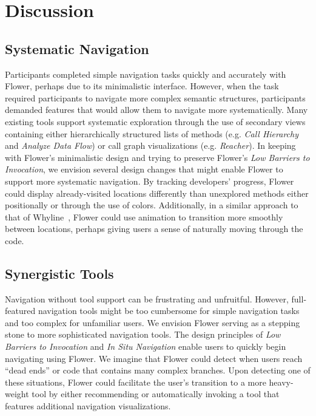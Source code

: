 \documentclass[conference]{IEEEtran}
\begin{document}
\section{Discussion}

\subsection{Systematic Navigation}
Participants completed simple navigation tasks quickly and accurately with Flower, perhaps due to its minimalistic interface.
However, when the task required participants to navigate more complex semantic structures, participants demanded features that would allow them to navigate more systematically.
Many existing tools support systematic exploration through the use of secondary views containing either hierarchically structured lists of methods (e.g. \textit{Call Hierarchy} and \textit{Analyze Data Flow}) or call graph visualizations (e.g. \textit{Reacher}).
In keeping with Flower's minimalistic design and trying to preserve Flower's \textit{Low Barriers to Invocation}, we envision several design changes that might enable Flower  to support more systematic navigation.
By tracking developers' progress, Flower  could display already-visited locations differently than unexplored methods either positionally or through the use of colors.
Additionally, in a similar approach to that of Whyline~\cite{Whyline}, Flower  could use animation to transition more smoothly between locations, perhaps giving users a sense of naturally moving through the code.


\subsection{Synergistic Tools}
Navigation without tool support can be frustrating and unfruitful.
However, full-featured navigation tools might be too cumbersome for simple navigation tasks and too complex for unfamiliar users.
We envision Flower  serving as a stepping stone to more sophisticated navigation tools. 
The design principles of \textit{Low Barriers to Invocation} and \textit{In Situ Navigation} enable users to quickly begin navigating using Flower. 
We imagine that Flower  could detect when users reach ``dead ends'' or code that contains many complex branches.
Upon detecting one of these situations, Flower  could facilitate the user's transition to a more heavy-weight tool by either recommending or automatically invoking a tool that features additional navigation visualizations.
\end{document}
